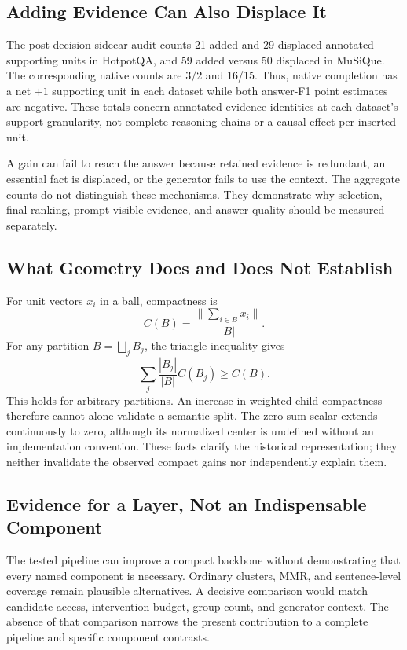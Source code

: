 \documentclass[11pt]{article}
\begin{document}
\subsection{Adding Evidence Can Also Displace It}
The post-decision sidecar audit counts 21 added and 29 displaced annotated
supporting units in HotpotQA, and 59 added versus 50 displaced in MuSiQue.
The corresponding native counts are 3/2 and 16/15.
Thus, native completion has a net $+1$ supporting unit in each dataset while
both answer-F1 point estimates are negative. These totals concern annotated
evidence identities at each dataset's support granularity, not complete
reasoning chains or a causal effect per inserted unit.

A gain can fail to reach the answer because retained evidence is redundant,
an essential fact is displaced, or the generator fails to use the context.
The aggregate counts do not distinguish these mechanisms. They demonstrate
why selection, final ranking, prompt-visible evidence, and answer quality
should be measured separately.

\subsection{What Geometry Does and Does Not Establish}
For unit vectors $x_i$ in a ball, compactness is
\begin{equation}
C(B)=\frac{\|\sum_{i\in B}x_i\|}{|B|}.
\end{equation}
For any partition $B=\bigsqcup_j B_j$, the triangle inequality gives
\begin{equation}
\sum_j\frac{|B_j|}{|B|}C(B_j)\geq C(B).
\end{equation}
This holds for arbitrary partitions. An increase in weighted child
compactness therefore cannot alone validate a semantic split. The zero-sum
scalar extends continuously to zero, although its normalized center is
undefined without an implementation convention.
These facts clarify the historical representation; they neither invalidate
the observed compact gains nor independently explain them.

\subsection{Evidence for a Layer, Not an Indispensable Component}
The tested pipeline can improve a compact backbone without demonstrating that
every named component is necessary. Ordinary clusters, MMR, and sentence-level
coverage remain plausible alternatives. A decisive comparison would match
candidate access, intervention budget, group count, and generator context.
The absence of that comparison narrows the present contribution to a complete
pipeline and specific component contrasts.
\end{document}
